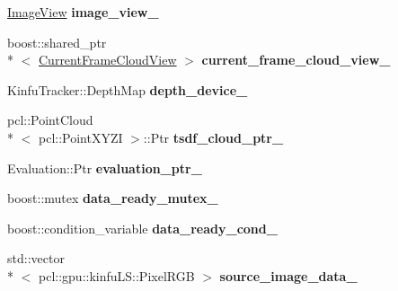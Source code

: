\begin{DoxyCompactItemize}
\item 
\hypertarget{struct_kin_fu_l_s_app_ab70151a58a620d9da106528e2d4328e9}{\hyperlink{struct_image_view}{Image\+View} {\bfseries image\+\_\+view\+\_\+}}\label{struct_kin_fu_l_s_app_ab70151a58a620d9da106528e2d4328e9}

\item 
\hypertarget{struct_kin_fu_l_s_app_af5566b10bf5cb0b62fb5f7fb7ad89134}{boost\+::shared\+\_\+ptr\\*
$<$ \hyperlink{struct_current_frame_cloud_view}{Current\+Frame\+Cloud\+View} $>$ {\bfseries current\+\_\+frame\+\_\+cloud\+\_\+view\+\_\+}}\label{struct_kin_fu_l_s_app_af5566b10bf5cb0b62fb5f7fb7ad89134}

\item 
\hypertarget{struct_kin_fu_l_s_app_a6ffc741a4ccd7cd922113d02d4a18570}{Kinfu\+Tracker\+::\+Depth\+Map {\bfseries depth\+\_\+device\+\_\+}}\label{struct_kin_fu_l_s_app_a6ffc741a4ccd7cd922113d02d4a18570}

\item 
\hypertarget{struct_kin_fu_l_s_app_ab1a30ac44ea215a0e238d356c3799417}{pcl\+::\+Point\+Cloud\\*
$<$ pcl\+::\+Point\+X\+Y\+Z\+I $>$\+::Ptr {\bfseries tsdf\+\_\+cloud\+\_\+ptr\+\_\+}}\label{struct_kin_fu_l_s_app_ab1a30ac44ea215a0e238d356c3799417}

\item 
\hypertarget{struct_kin_fu_l_s_app_a17f5ee34dd0d278366798f700cf0a8ba}{Evaluation\+::\+Ptr {\bfseries evaluation\+\_\+ptr\+\_\+}}\label{struct_kin_fu_l_s_app_a17f5ee34dd0d278366798f700cf0a8ba}

\item 
\hypertarget{struct_kin_fu_l_s_app_a2efa66f544a6e297931b0149cbd386a6}{boost\+::mutex {\bfseries data\+\_\+ready\+\_\+mutex\+\_\+}}\label{struct_kin_fu_l_s_app_a2efa66f544a6e297931b0149cbd386a6}

\item 
\hypertarget{struct_kin_fu_l_s_app_ae7606382c03b67819472d32dd17e5754}{boost\+::condition\+\_\+variable {\bfseries data\+\_\+ready\+\_\+cond\+\_\+}}\label{struct_kin_fu_l_s_app_ae7606382c03b67819472d32dd17e5754}

\item 
\hypertarget{struct_kin_fu_l_s_app_af97d98a16c6645357316a2ce5ca08c11}{std\+::vector\\*
$<$ pcl\+::gpu\+::kinfu\+L\+S\+::\+Pixel\+R\+G\+B $>$ {\bfseries source\+\_\+image\+\_\+data\+\_\+}}\label{struct_kin_fu_l_s_app_af97d98a16c6645357316a2ce5ca08c11}


\end{DoxyCompactItemize}
